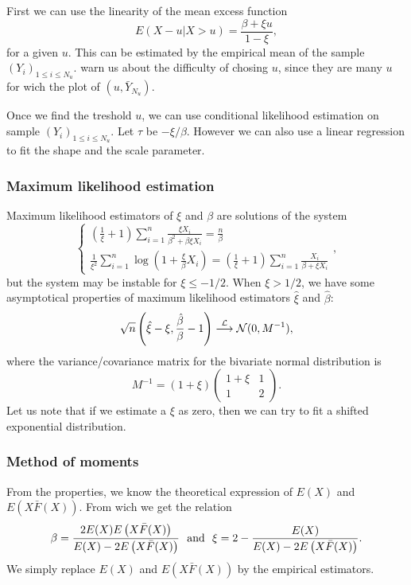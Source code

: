 First we can use the linearity of the mean excess function
$$
E(X-u | X>u) = \frac{\beta+\xi u}{1-\xi},
$$
for a given $u$. This can be estimated by the empirical mean of the sample $(Y_i)_{1\leq i \leq N_u}$. \cite{tve} warn us about the difficulty of chosing $u$, since they are many $u$ for wich the plot of 
$(u, \bar Y_{N_u})$.

Once we find the treshold $u$, we can use conditional likelihood estimation on sample $(Y_i)_{1\leq i \leq N_u}$. Let $\tau$ be $ -\xi/\beta$. However we can also use a linear regression to fit the shape and the scale parameter.


\subsubsection{Maximum likelihood estimation}
Maximum likelihood estimators of $\xi$ and $\beta$ are solutions of the system
$$
\left\{
\begin{array}{l}
 \left(\frac{1}{\xi}+1\right)\sum\limits_{i=1}^n \frac{\xi X_i}{\beta^2+\beta \xi X_i} = \frac{n}{\beta}\\
 \frac{1}{\xi^2}\sum\limits_{i=1}^n\log\left(1+\frac{\xi}{\beta}X_i\right) = (\frac{1}{\xi}+1)\sum\limits_{i=1}^n\frac{X_i}{\beta+\xi X_i}
 \end{array}
 \right. ,
$$
but the system may be instable for $\xi\leq-1/2$. When $\xi>1/2$, we have some asymptotical properties of maximum likelihood estimators $\hat \xi$ and $\hat \beta$:
$$
\sqrt{n}\left(\hat\xi -\xi, \frac{\hat\beta}{\beta}-1\right) \stackrel{\mathcal L}{\longrightarrow} \mathcal N(0,M^{-1}),
$$
where the variance/covariance matrix for the bivariate normal distribution is
$$
M^{-1} = (1+\xi)\left(
\begin{array}{cc}
1+\xi & 1\\
1 & 2
\end{array}
\right) .
$$
Let us note that if we estimate a $\xi$ as zero, then we can try to fit a shifted exponential distribution.

\subsubsection{Method of moments}
From the properties, we know the theoretical expression of $E(X)$ and $E\left(X \bar F(X) \right)$. From wich we get the relation 
$$
\beta = \frac{2E(X)E\left(X \bar F(X) \right)}{E(X)-2E\left(X \bar F(X) \right)} \textrm{~~and~~} \xi = 2-\frac{E(X)}{E(X)-2E\left(X \bar F(X) \right)}.
$$
We simply replace $E(X)$ and $E\left(X \bar F(X) \right)$ by the empirical estimators.

